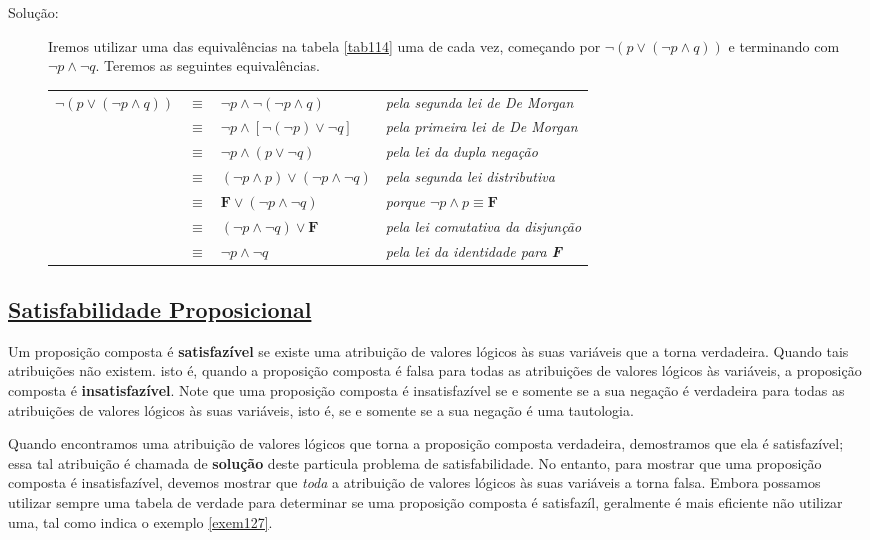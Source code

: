 \begin{description}
\item[Solução:] Iremos utilizar uma das equivalências na tabela \ref{tab114}
uma de cada vez, começando por $\lnot (p \lor (\lnot p \land q))$ e terminando
com $\lnot p \land \lnot q$. Teremos as seguintes equivalências.

\begin{table}[H]
	\centering
	\begin{tabular}{rcll}%
	$\lnot (p \lor (\lnot p \land q))$ & $\equiv$ & $\lnot p \land \lnot (\lnot p
	\land q)$ & \emph{pela segunda lei de De Morgan}\\
	 & $\equiv$ & $\lnot p \land [\lnot(\lnot p) \lor \lnot q]$ & \emph{pela
	 primeira lei de De Morgan}\\	
	& $\equiv$ & $\lnot p \land (p \lor \lnot q)$ & \emph{pela lei da dupla
	negação}\\
	& $\equiv$ & $(\lnot p \land p) \lor (\lnot p \land \lnot q)$ & \emph{pela
	segunda lei distributiva}\\
	& $\equiv$ & $\textbf{F} \lor (\lnot p \land \lnot q)$ & \emph{porque $\lnot
	p \land p \equiv \textbf{F}$}\\
	& $\equiv$ & $(\lnot p \land \lnot q) \lor \textbf{F}$ & \emph{pela lei
	comutativa da disjunção}\\
	& $\equiv$ & $\lnot p \land \lnot q$ & \emph{pela lei da identidade para
	\textbf{F}}
	
	\end{tabular}%
\end{table}
\end{description}

\subsection*{\underline{Satisfabilidade Proposicional}}

Um proposição composta é \textbf{satisfazível} se existe uma atribuição de
valores lógicos às suas variáveis que a torna verdadeira. Quando tais
atribuições não existem. isto é, quando a proposição composta é falsa para todas
as atribuições de valores lógicos às variáveis, a proposição composta é
\textbf{insatisfazível}. Note que uma proposição composta é insatisfazível se e
somente se a sua negação é verdadeira para todas as atribuições de valores
lógicos às suas variáveis, isto é, se e somente se a sua negação é uma
tautologia.

Quando encontramos uma atribuição de valores lógicos que torna a proposição
composta verdadeira, demostramos que ela é satisfazível; essa tal atribuição é
chamada de \textbf{solução} deste particula problema de satisfabilidade. No
entanto, para mostrar que uma proposição composta é insatisfazível, devemos
mostrar que \emph{toda} a atribuição de valores lógicos às suas variáveis a
torna falsa. Embora possamos utilizar sempre uma tabela de verdade para
determinar se uma proposição composta é satisfazíl, geralmente é mais eficiente
não utilizar uma, tal como indica o exemplo \ref{exem127}.

